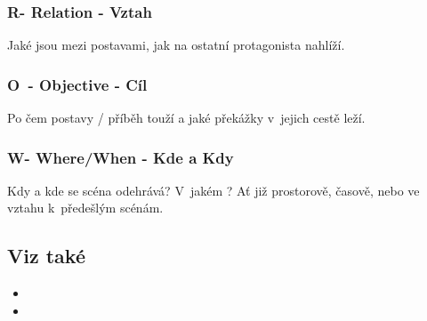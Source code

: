 \subsubsection{ R- Relation - Vztah } Jaké jsou  mezi postavami, jak na ostatní protagonista nahlíží. 
 
\subsubsection{ O~- Objective - Cíl } Po čem postavy / příběh touží a jaké překážky v~jejich cestě leží. 
 
\subsubsection{ W- Where/When - Kde a Kdy } Kdy a kde se scéna odehrává? V~jakém ? Ať již prostorově, časově, nebo ve vztahu k~předešlým scénám. 
 
 
\subsection{ Viz také } \begin{itemize}
\item  {}
\item  {}
\end{itemize}
 
 
 
